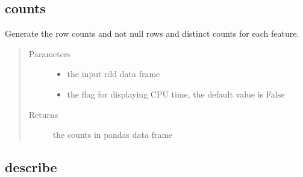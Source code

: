 \documentclass[letterpaper,12pt,english]{sphinxmanual}
\begin{document}
\subsection{counts}
\label{\detokenize{basics:counts}}

\begin{fulllineitems}
Generate the row counts and not null rows and distinct counts for each feature.
\begin{quote}\begin{description}
\item[{Parameters}] \leavevmode\begin{itemize}
\item {} 
 \textendash{} the input rdd data frame

\item {} 
 \textendash{} the flag for displaying CPU time, the default value is False

\end{itemize}

\item[{Returns}] \leavevmode
the counts in pandas data frame

\end{description}\end{quote}

\end{fulllineitems}



\subsection{describe}
\label{\detokenize{basics:describe}}
\end{document}
